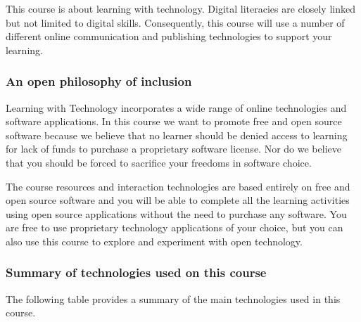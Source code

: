 \documentclass[
]{book}
\theoremstyle{definition}
\theoremstyle{definition}
\theoremstyle{definition}
\theoremstyle{definition}
\theoremstyle{remark}
\begin{document}
This course is about learning with technology. Digital literacies are closely linked but not limited to digital skills. Consequently, this course will use a number of different online communication and publishing technologies to support your learning.

\hypertarget{an-open-philosophy-of-inclusion}{%
\subsubsection*{An open philosophy of inclusion}\label{an-open-philosophy-of-inclusion}}

Learning with Technology incorporates a wide range of online technologies and software applications. In this course we want to promote free and open source software because we believe that no learner should be denied access to learning for lack of funds to purchase a proprietary software license. Nor do we believe that you should be forced to sacrifice your freedoms in software choice.

The course resources and interaction technologies are based entirely on free and open source software and you will be able to complete all the learning activities using open source applications without the need to purchase any software. You are free to use proprietary technology applications of your choice, but you can also use this course to explore and experiment with open technology.

\hypertarget{summary-of-technologies-used-on-this-course}{%
\subsubsection*{Summary of technologies used on this course}\label{summary-of-technologies-used-on-this-course}}

The following table provides a summary of the main technologies used in this course.
\end{document}
